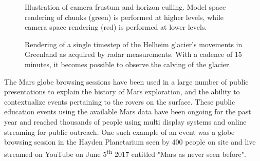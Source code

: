 \documentclass[journal]{vgtc}                %
\begin{document}
\begin{figure}[t!]
    \centering
        \caption{Illustration of camera frustum and horizon culling. Model space rendering of chunks (green) is performed at higher levels, while camera space rendering (red) is performed at lower levels.}
    \label{fig:frustum_mars}\vspace*{-4mm}
\end{figure}

\begin{figure}[b!]\vspace*{-4mm}
    \centering
        \caption{Rendering of a single timestep of the Helheim glacier's movements in Greenland as acquired by radar measurements. With a cadence of 15 minutes, it becomes possible to observe the calving of the glacier.}
    \label{fig:glacier}
\end{figure}

The Mars globe browsing sessions have been used in a large number of public presentations to explain the history of Mars exploration, and the ability to contextualize events pertaining to the rovers on the surface.
These public education events using the available Mars data have been ongoing for the past year and reached thousands of people using multi display systems and online streaming for public outreach. One such example of an event was a globe browsing session in the Hayden Planetarium seen by 400 people on site and live streamed on YouTube on June 5\textsuperscript{th} 2017 entitled "Mars as never seen before".
\end{document}
